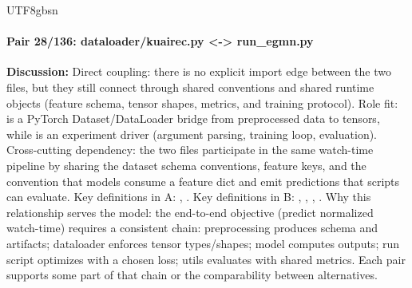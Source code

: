 \documentclass[11pt]{article}
\begin{document}
\begin{CJK*}{UTF8}{gbsn}
\paragraph{Pair 28/136: dataloader/kuairec.py <-> run\_egmn.py}
\textbf{Discussion:} Direct coupling: there is no explicit import edge between the two files, but they still connect through shared conventions and shared runtime objects (feature schema, tensor shapes, metrics, and training protocol). Role fit: \texttt{} is a PyTorch Dataset/DataLoader bridge from preprocessed data to tensors, while \texttt{} is an experiment driver (argument parsing, training loop, evaluation). Cross-cutting dependency: the two files participate in the same watch-time pipeline by sharing the dataset schema conventions, feature keys, and the convention that models consume a feature dict and emit predictions that scripts can evaluate. Key definitions in A: \texttt{}, \texttt{}. Key definitions in B: \texttt{}, \texttt{}, \texttt{}, \texttt{}. Why this relationship serves the model: the end-to-end objective (predict normalized watch-time) requires a consistent chain: preprocessing produces schema and artifacts; dataloader enforces tensor types/shapes; model computes outputs; run script optimizes with a chosen loss; utils evaluates with shared metrics. Each pair supports some part of that chain or the comparability between alternatives.


\end{CJK*}
\end{document}
